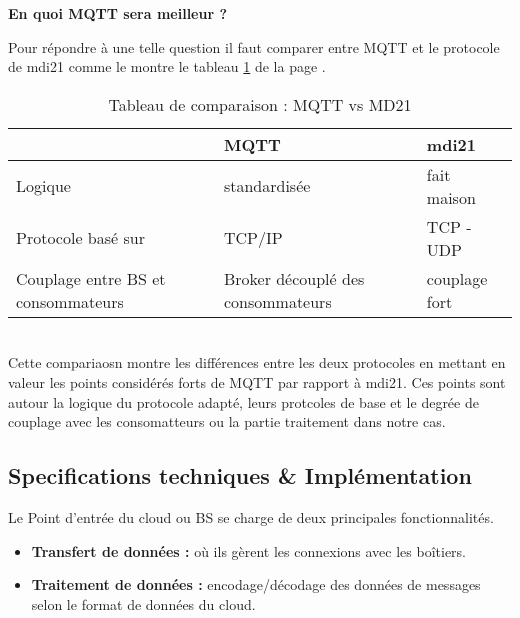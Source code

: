     {
        \large 
        \centering
        \textbf{En quoi MQTT sera meilleur ?  } 
    
    }  
    Pour répondre à une telle question il faut comparer entre MQTT et le protocole de \gls{mdi21} comme le montre le tableau \ref{table:mqttvsmd21}
    de la page \pageref{table:mqttvsmd21}.
    \begin{table}[h!]
        \centering
        \begin{tabular}{|p{5cm}|p{5cm}|p{5cm}|}
            \hline
            \centering

               & MQTT & \gls{mdi21} \\
            \hline
            Logique & standardisée & fait maison  \\
            \hline
           Protocole basé sur & TCP/IP & TCP - UDP\\
            \hline 
            Couplage entre BS et consommateurs & Broker découplé des consommateurs & couplage fort \\
            \hline
        \end{tabular}   
        \caption{Tableau de comparaison : MQTT vs MD21}
        \label{table:mqttvsmd21}
    \end{table} \\
       

        Cette compariaosn montre les différences entre les deux protocoles en mettant en valeur les points considérés forts de MQTT par rapport
        à \gls{mdi21}. 
        Ces points sont autour la logique du protocole adapté, leurs protcoles de base et le degrée de couplage avec les consomatteurs 
        ou la partie traitement dans notre cas. \\
        
    \subsection{Specifications techniques \& Implémentation}
       
        Le Point d’entrée du cloud ou BS se charge de deux principales fonctionnalités. 
        \begin{itemize}
            \renewcommand{\labelitemi}{$\bullet$}
            \item  \textbf{Transfert de données :} où ils gèrent les connexions avec les boîtiers.
            \item  \textbf{Traitement de données :} encodage/décodage des données de messages selon le format de données du cloud.
        \end{itemize}

